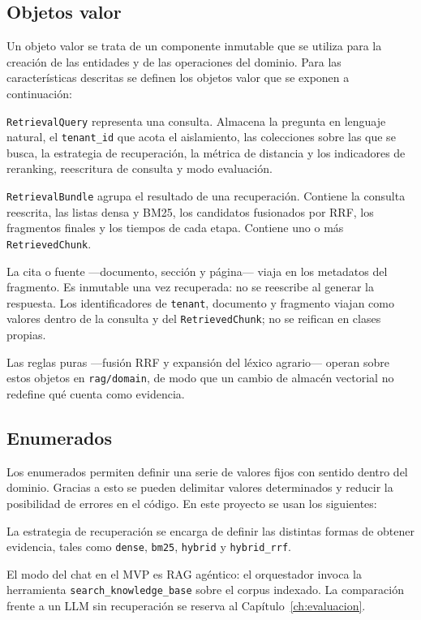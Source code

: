 \subsection{Objetos valor}
Un objeto valor se trata de un componente inmutable que se utiliza para la creación de las entidades y de las operaciones del dominio. Para las características descritas se definen los objetos valor que se exponen a continuación:

\texttt{RetrievalQuery} representa una consulta. Almacena la pregunta en lenguaje natural, el \texttt{tenant\_id} que acota el aislamiento, las colecciones sobre las que se busca, la estrategia de recuperación, la métrica de distancia y los indicadores de reranking, reescritura de consulta y modo evaluación.

\texttt{RetrievalBundle} agrupa el resultado de una recuperación. Contiene la consulta reescrita, las listas densa y BM25, los candidatos fusionados por RRF, los fragmentos finales y los tiempos de cada etapa. Contiene uno o más \texttt{RetrievedChunk}.

La cita o fuente ---documento, sección y página--- viaja en los metadatos del fragmento. Es inmutable una vez recuperada: no se reescribe al generar la respuesta. Los identificadores de \texttt{tenant}, documento y fragmento viajan como valores dentro de la consulta y del \texttt{RetrievedChunk}; no se reifican en clases propias.

Las reglas puras ---fusión RRF y expansión del léxico agrario--- operan sobre estos objetos en \texttt{rag/domain}, de modo que un cambio de almacén vectorial no redefine qué cuenta como evidencia.

\subsection{Enumerados}
Los enumerados permiten definir una serie de valores fijos con sentido dentro del dominio. Gracias a esto se pueden delimitar valores determinados y reducir la posibilidad de errores en el código. En este proyecto se usan los siguientes:

La estrategia de recuperación se encarga de definir las distintas formas de obtener evidencia, tales como \texttt{dense}, \texttt{bm25}, \texttt{hybrid} y \texttt{hybrid\_rrf}.

El modo del chat en el MVP es RAG agéntico: el orquestador invoca la herramienta \texttt{search\_knowledge\_base} sobre el corpus indexado. La comparación frente a un LLM sin recuperación se reserva al Capítulo~\ref{ch:evaluacion}.

